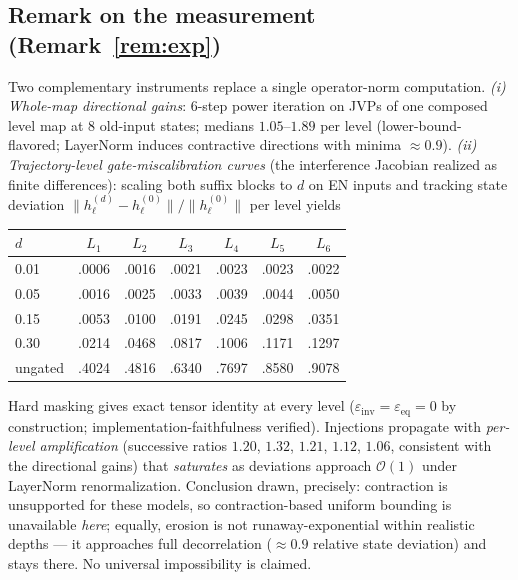 \documentclass[11pt]{article}
\theoremstyle{definition}\newtheorem{definition}{Definition}
\theoremstyle{remark}\newtheorem{remark}{Remark}
\begin{document}
\subsection{Remark on the measurement (Remark~\ref{rem:exp})}\label{app:meas}
Two complementary instruments replace a single operator-norm computation.
\emph{(i) Whole-map directional gains}: 6-step power iteration on JVPs of one composed
level map at 8 old-input states; medians $1.05$--$1.89$ per level (lower-bound-flavored;
LayerNorm induces contractive directions with minima ${\approx}0.9$).
\emph{(ii) Trajectory-level gate-miscalibration curves} (the interference Jacobian realized
as finite differences): scaling both suffix blocks to $d$ on EN inputs and tracking state
deviation $\|h^{(d)}_\ell-h^{(0)}_\ell\|/\|h^{(0)}_\ell\|$ per level yields

\begin{center}\small
\begin{tabular}{lcccccc}
\toprule
$d$ & $L_1$ & $L_2$ & $L_3$ & $L_4$ & $L_5$ & $L_6$ \\
\midrule
0.01 & .0006 & .0016 & .0021 & .0023 & .0023 & .0022 \\
0.05 & .0016 & .0025 & .0033 & .0039 & .0044 & .0050 \\
0.15 & .0053 & .0100 & .0191 & .0245 & .0298 & .0351 \\
0.30 & .0214 & .0468 & .0817 & .1006 & .1171 & .1297 \\
ungated & .4024 & .4816 & .6340 & .7697 & .8580 & .9078 \\
\bottomrule
\end{tabular}
\end{center}

Hard masking gives exact tensor identity at every level ($\varepsilon_{\mathrm{inv}}
=\varepsilon_{\mathrm{eq}}=0$ by construction; implementation-faithfulness verified).
Injections propagate with \emph{per-level amplification} (successive ratios $1.20$, $1.32$, $1.21$, $1.12$, $1.06$,
consistent with the directional gains) that \emph{saturates} as deviations approach
$\mathcal{O}(1)$ under LayerNorm renormalization. Conclusion drawn, precisely: contraction
is unsupported for these models, so contraction-based uniform bounding is unavailable
\emph{here}; equally, erosion is not runaway-exponential within realistic depths --- it
approaches full decorrelation (${\approx}0.9$ relative state deviation) and stays there.
No universal impossibility is claimed.
\end{document}
